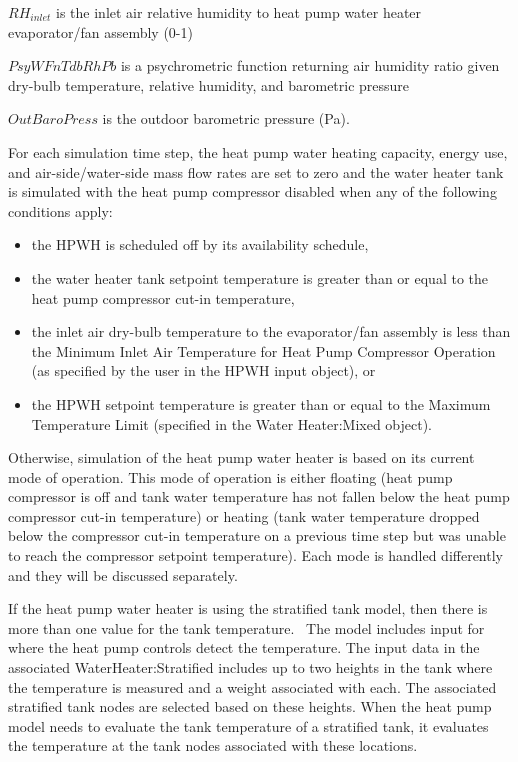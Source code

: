 \(R{H_{inlet}}\) is the inlet air relative humidity to heat pump water heater evaporator/fan assembly (0-1)

\(PsyWFnTdbRhPb\) is a psychrometric function returning air humidity ratio given dry-bulb temperature, relative humidity, and barometric pressure

\(OutBaroPress\) is the outdoor barometric pressure (Pa).

For each simulation time step, the heat pump water heating capacity, energy use, and air-side/water-side mass flow rates are set to zero and the water heater tank is simulated with the heat pump compressor disabled when any of the following conditions apply:

\begin{itemize}
\item the HPWH is scheduled off by its availability schedule,
\item the water heater tank setpoint temperature is greater than or equal to the heat pump compressor cut-in temperature,
\item the inlet air dry-bulb temperature to the evaporator/fan assembly is less than the Minimum Inlet Air Temperature for Heat Pump Compressor Operation (as specified by the user in the HPWH input object), or
\item the HPWH setpoint temperature is greater than or equal to the Maximum Temperature Limit (specified in the Water Heater:Mixed object).
\end{itemize}

Otherwise, simulation of the heat pump water heater is based on its current mode of operation. This mode of operation is either floating (heat pump compressor is off and tank water temperature has not fallen below the heat pump compressor cut-in temperature) or heating (tank water temperature dropped below the compressor cut-in temperature on a previous time step but was unable to reach the compressor setpoint temperature). Each mode is handled differently and they will be discussed separately.

If the heat pump water heater is using the stratified tank model, then there is more than one value for the tank temperature.~ The model includes input for where the heat pump controls detect the temperature. The input data in the associated WaterHeater:Stratified includes up to two heights in the tank where the temperature is measured and a weight associated with each. The associated stratified tank nodes are selected based on these heights. When the heat pump model needs to evaluate the tank temperature of a stratified tank, it evaluates the temperature at the tank nodes associated with these locations.

